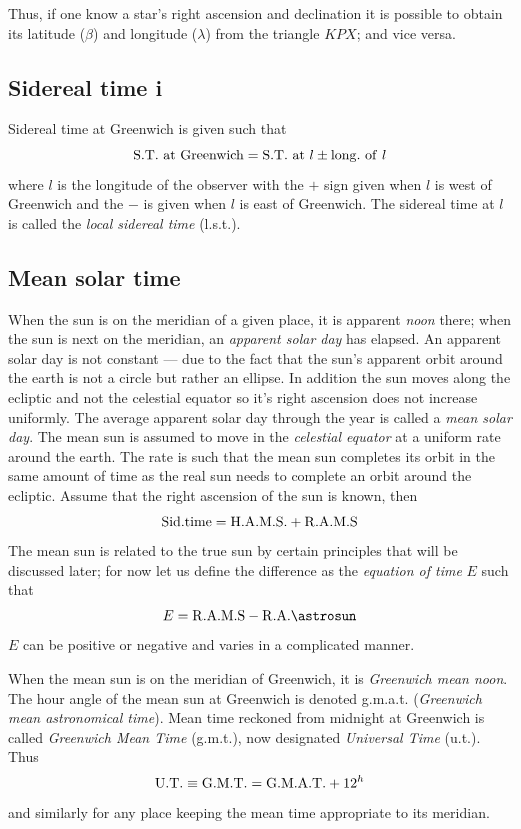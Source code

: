 Thus, if one know a star's right ascension and declination it is
possible to obtain its latitude ($\beta$) and longitude ($\lambda$)
from the triangle $KPX$; and vice versa.

\subsection{Sidereal time {\sc i}}
\label{sec:sidereal_time_i}

Sidereal time at Greenwich is given such that
\[
{\rm S.T.~at~Greenwich}={\rm S.T.~at}~l\pm{\rm long.~of~}l
\]
where $l$ is the longitude of the observer with the $+$ sign given
when $l$ is west of Greenwich and the $-$ is given when $l$ is east of
Greenwich. The sidereal time at $l$ is called the {\it local sidereal
  time} ({\sc l.s.t.}).

\subsection{Mean solar time}

When the sun is on the meridian of a given place, it is apparent {\it
  noon} there; when the sun is next on the meridian, an {\it apparent
  solar day} has elapsed. An apparent solar day is not constant --- due
to the fact that the sun's apparent orbit around the earth is not a
circle but rather an ellipse. In addition the sun moves along the
ecliptic and not the celestial equator so it's right ascension does
not increase uniformly. The average apparent solar day through the
year is called a {\it mean solar day}. The mean sun is assumed to
move in the {\it celestial equator} at a uniform rate around the
earth. The rate is such that the mean sun completes its orbit in the
same amount of time as the real sun needs to complete an orbit around
the ecliptic. Assume that the right ascension of the sun is known,
then 
\[
{\rm Sid. time}={\rm H.A.M.S.}+{\rm R.A.M.S}
\]
The mean sun is related to the true sun by certain principles that
will be discussed later; for now let us define the difference as the
{\it equation of time} $E$ such that
\[
E={\rm R.A.M.S-R.A.\astrosun}
\]
$E$ can be positive or negative and varies in a complicated manner. 

When the mean sun is on the meridian of Greenwich, it is {\it Greenwich
  mean noon}. The hour angle of the mean sun at Greenwich is denoted
{\sc g.m.a.t.} ({\it Greenwich mean astronomical time}). 
Mean time reckoned from midnight at Greenwich is called
{\it Greenwich Mean Time} ({\sc g.m.t.}), now designated {\it
  Universal Time} ({\sc u.t.}). Thus
\[
{\rm U.T.}\equiv{\rm G.M.T.}={\rm G.M.A.T.}+12^h
\]
and similarly for any place keeping the mean time appropriate to its
meridian. 

